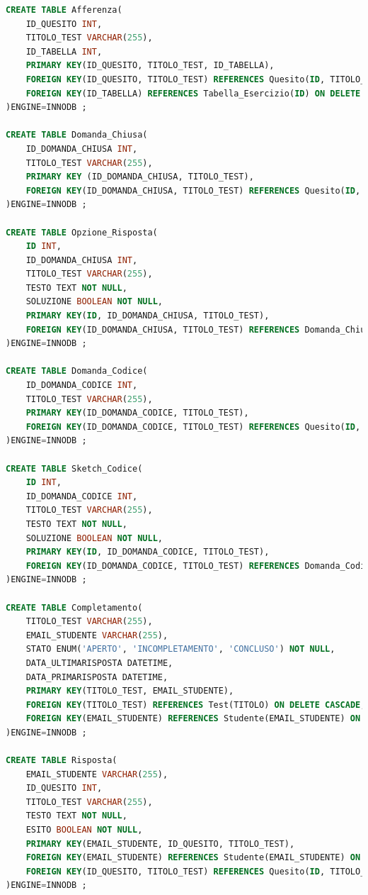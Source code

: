 \documentclass{article}
\begin{document}
\begin{lstlisting}[language=SQL, title=Codice SQL completo dello schema della base di dati.]
CREATE TABLE Afferenza(
    ID_QUESITO INT,
    TITOLO_TEST VARCHAR(255),
    ID_TABELLA INT,
    PRIMARY KEY(ID_QUESITO, TITOLO_TEST, ID_TABELLA),
    FOREIGN KEY(ID_QUESITO, TITOLO_TEST) REFERENCES Quesito(ID, TITOLO_TEST) ON DELETE CASCADE,
    FOREIGN KEY(ID_TABELLA) REFERENCES Tabella_Esercizio(ID) ON DELETE CASCADE
)ENGINE=INNODB ;

CREATE TABLE Domanda_Chiusa(
    ID_DOMANDA_CHIUSA INT,
    TITOLO_TEST VARCHAR(255),
    PRIMARY KEY (ID_DOMANDA_CHIUSA, TITOLO_TEST),
    FOREIGN KEY(ID_DOMANDA_CHIUSA, TITOLO_TEST) REFERENCES Quesito(ID, TITOLO_TEST) ON DELETE CASCADE 
)ENGINE=INNODB ;

CREATE TABLE Opzione_Risposta(
    ID INT,
    ID_DOMANDA_CHIUSA INT,
    TITOLO_TEST VARCHAR(255),
    TESTO TEXT NOT NULL,
    SOLUZIONE BOOLEAN NOT NULL,
    PRIMARY KEY(ID, ID_DOMANDA_CHIUSA, TITOLO_TEST),
    FOREIGN KEY(ID_DOMANDA_CHIUSA, TITOLO_TEST) REFERENCES Domanda_Chiusa(ID_DOMANDA_CHIUSA, TITOLO_TEST) ON DELETE CASCADE    
)ENGINE=INNODB ;

CREATE TABLE Domanda_Codice(
    ID_DOMANDA_CODICE INT,
    TITOLO_TEST VARCHAR(255),
    PRIMARY KEY(ID_DOMANDA_CODICE, TITOLO_TEST),
    FOREIGN KEY(ID_DOMANDA_CODICE, TITOLO_TEST) REFERENCES Quesito(ID, TITOLO_TEST) ON DELETE CASCADE    
)ENGINE=INNODB ;

CREATE TABLE Sketch_Codice(
    ID INT,
    ID_DOMANDA_CODICE INT,
    TITOLO_TEST VARCHAR(255),
    TESTO TEXT NOT NULL,
    SOLUZIONE BOOLEAN NOT NULL,
    PRIMARY KEY(ID, ID_DOMANDA_CODICE, TITOLO_TEST),
    FOREIGN KEY(ID_DOMANDA_CODICE, TITOLO_TEST) REFERENCES Domanda_Codice(ID_DOMANDA_CODICE, TITOLO_TEST) ON DELETE CASCADE    
)ENGINE=INNODB ;

CREATE TABLE Completamento(
    TITOLO_TEST VARCHAR(255), 
    EMAIL_STUDENTE VARCHAR(255),
    STATO ENUM('APERTO', 'INCOMPLETAMENTO', 'CONCLUSO') NOT NULL, 
    DATA_ULTIMARISPOSTA DATETIME,
    DATA_PRIMARISPOSTA DATETIME,
    PRIMARY KEY(TITOLO_TEST, EMAIL_STUDENTE),
    FOREIGN KEY(TITOLO_TEST) REFERENCES Test(TITOLO) ON DELETE CASCADE,
    FOREIGN KEY(EMAIL_STUDENTE) REFERENCES Studente(EMAIL_STUDENTE) ON DELETE CASCADE
)ENGINE=INNODB ;

CREATE TABLE Risposta(
    EMAIL_STUDENTE VARCHAR(255),
    ID_QUESITO INT,
    TITOLO_TEST VARCHAR(255),
    TESTO TEXT NOT NULL,
    ESITO BOOLEAN NOT NULL,
    PRIMARY KEY(EMAIL_STUDENTE, ID_QUESITO, TITOLO_TEST),
    FOREIGN KEY(EMAIL_STUDENTE) REFERENCES Studente(EMAIL_STUDENTE) ON DELETE CASCADE,
    FOREIGN KEY(ID_QUESITO, TITOLO_TEST) REFERENCES Quesito(ID, TITOLO_TEST) ON DELETE CASCADE
)ENGINE=INNODB ;


\end{lstlisting}
\end{document}
